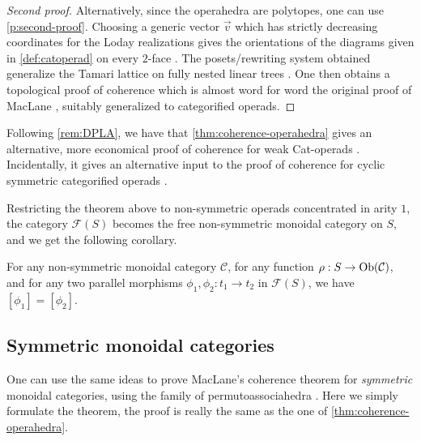 \begin{proof}[Second proof]
    Alternatively, since the operahedra are polytopes, one can use \cref{p:second-proof}. 
    Choosing a generic vector $\vec v$ which has strictly decreasing coordinates for the Loday realizations \cite[Section 2.2]{laplante-anfossiDiagonalOperahedra2022a} gives the orientations of the diagrams given in \cref{def:catoperad} on every $2$-face \cite[Proposition 3.11]{laplante-anfossiDiagonalOperahedra2022a}.
    The posets/rewriting system obtained generalize the Tamari lattice on fully nested linear trees \cite[Definition 2.8]{laplante-anfossiDiagonalOperahedra2022a}.
    One then obtains a topological proof of coherence which is almost word for word the original proof of MacLane \cite[Theorem 3.1]{MacLane63}, suitably generalized to categorified operads. 
\end{proof}
   
Following \cref{rem:DPLA}, we have that \cref{thm:coherence-operahedra} gives an alternative, more economical proof of coherence for weak Cat-operads \cite[Proposition 14.2]{DP15}.
Incidentally, it gives an alternative input to the proof of coherence for cyclic symmetric categorified operads \cite{curienCategorifiedCyclicOperads2020}.

Restricting the theorem above to non-symmetric operads concentrated in arity $1$, the category $\mathcal{F}(S)$ becomes the free non-symmetric monoidal category on $S$, and we get the following corollary. 

\begin{corollary}
\label{cor:MacLane}
    For any non-symmetric monoidal category $\mathcal{C}$, for any function $\rho : S \to \mathrm{Ob}(\mathcal{C})$, and for any two parallel morphisms $\phi_1,\phi_2: t_1 \to t_2$ in $\mathcal{F}(S)$, we have $[\phi_1]=[\phi_2]$.
\end{corollary}

\subsection{Symmetric monoidal categories} 
One can use the same ideas to prove MacLane's coherence theorem for \emph{symmetric} monoidal categories, using the family of permutoassociahedra \cite{kapranov1993,reinerCoxeterassociahedra1994}. 
Here we simply formulate the theorem, the proof is really the same as the one of \cref{thm:coherence-operahedra}.

